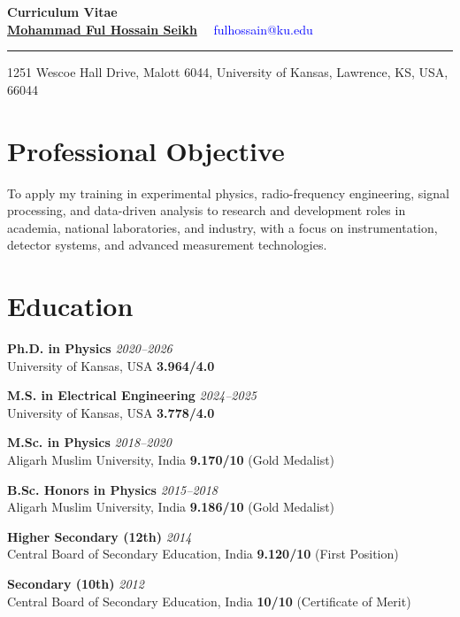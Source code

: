 \documentclass[10pt]{report}
\begin{document}
\begin{center}
    {\bf \huge Curriculum Vitae}\\[0.05cm]
    \href{https://physics.ku.edu/people/seikh-mohammad-ful-hossain}{\bf \large Mohammad Ful Hossain Seikh} ~~\textcolor{blue}{fulhossain@ku.edu}
    \rule{\textwidth}{0.4pt}
    1251 Wescoe Hall Drive, Malott 6044, University of Kansas, Lawrence, KS, USA, 66044
\end{center}

\section*{Professional Objective}
To apply my training in experimental physics, radio-frequency engineering, signal processing, and data-driven analysis to research and development roles in academia, national laboratories, and industry, with a focus on instrumentation, detector systems, and advanced measurement technologies.

\section*{Education}

\noindent
\textbf{Ph.D. in Physics} \textit{2020--2026} \\
University of Kansas, USA \hfill \textbf{3.964/4.0}

\vspace{0em}
\noindent
\textbf{M.S. in Electrical Engineering}    \textit{2024--2025} \\
University of Kansas, USA \hfill \textbf{3.778/4.0}

\vspace{0em}
\noindent
\textbf{M.Sc. in Physics}  \textit{2018--2020} \\
Aligarh Muslim University, India \hfill \textbf{9.170/10} (Gold Medalist)

\vspace{0em}
\noindent
\textbf{B.Sc. Honors in Physics}  \textit{2015--2018} \\
Aligarh Muslim University, India \hfill \textbf{9.186/10} (Gold Medalist)

\vspace{0em}
\noindent
\textbf{Higher Secondary (12th)}  \textit{2014} \\
Central Board of Secondary Education, India \hfill \textbf{9.120/10} (First Position)

\vspace{0em}
\noindent
\textbf{Secondary (10th)} \textit{2012} \\
Central Board of Secondary Education, India \hfill \textbf{10/10} (Certificate of Merit)
\end{document}
